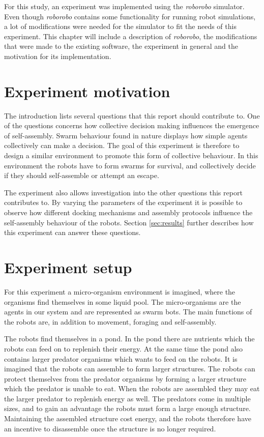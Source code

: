 For this study, an experiment was implemented using the \emph{roborobo} simulator\cite{bredeche_roborobo!_2013}.
Even though \emph{roborobo} contains some functionality for running robot simulations, a lot of modifications were needed for the simulator to fit the needs of this experiment.
This chapter will include a description of \emph{roborobo}, the modifications that were made to the existing software, the experiment in general and the motivation for its implementation.

\section{Experiment motivation}
The introduction lists several questions that this report should contribute to.
One of the questions concerns how collective decision making influences the emergence of self-assembly.
Swarm behaviour found in nature displays how simple agents collectively can make a decision.
The goal of this experiment is therefore to design a similar environment to promote this form of collective behaviour.
In this environment the robots have to form swarms for survival, and collectively decide if they should self-assemble or attempt an escape.

The experiment also allows investigation into the other questions this report contributes to.
By varying the parameters of the experiment it is possible to observe how different docking mechanisms and assembly protocols influence the self-assembly behaviour of the robots.
Section \ref{sec:results} further describes how this experiment can answer these questions.
\section{Experiment setup}
\label{sec:description}
For this experiment a micro-organism environment is imagined, where the organisms find themselves in some liquid pool. 
The micro-organisms are the agents in our system and are represented as swarm bots.
The main functions of the robots are, in addition to movement, foraging and self-assembly.

The robots find themselves in a pond.
In the pond there are nutrients which the robots can feed on to replenish their energy.
At the same time the pond also contains larger predator organisms which wants to feed on the robots.
It is imagined that the robots can assemble to form larger structures.
The robots can protect themselves from the predator organisms by forming a larger structure which the predator is unable to eat.
When the robots are assembled they may eat the larger predator to replenish energy as well.
The predators come in multiple sizes, and to gain an advantage the robots must form a large enough structure.
Maintaining the assembled structure cost energy, and the robots therefore have an incentive to disassemble once the structure is no longer required.

